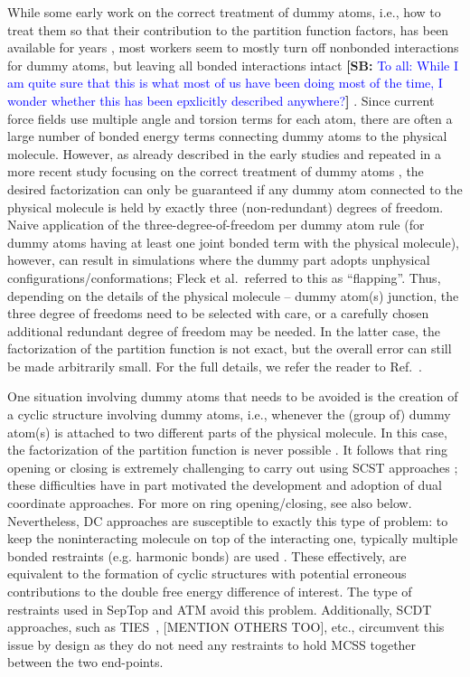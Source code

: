 \documentclass[9pt,bestpractices]{livecoms}
\newcommand{\sbnote}[1]{%
  {\bfseries{}[SB: }%
  {\textcolor{blue}{#1}}{\bfseries{}]}
}
\begin{document}
While some early work on the correct treatment of dummy atoms, i.e., how to treat them so that their contribution to the partition function factors, has been available for years \cite{Boresch_2002,Shobana_2000,Wang_2012}, most workers seem to mostly turn off nonbonded interactions for dummy atoms, but leaving all bonded interactions intact \sbnote{To all: While I am quite sure that this is what most of us have been doing most of the time, I wonder whether this has been epxlicitly described anywhere?}. Since current force fields use multiple angle and torsion terms for each atom, there are often a large number of bonded energy terms connecting dummy atoms to the physical molecule. However, as already described in the early studies and repeated in a more recent study focusing on the correct treatment of dummy atoms \cite{Fleck_2021}, the desired factorization can only be guaranteed if any dummy atom connected to the physical molecule is held by exactly three (non-redundant) degrees of freedom. Naive application of the three-degree-of-freedom per dummy atom rule (for dummy atoms having at least one joint bonded term with the physical molecule), however, can result in simulations where the dummy part adopts unphysical configurations/conformations; Fleck et al.\ referred to this as “flapping”. Thus, depending on the details of the physical molecule -- dummy atom(s) junction, the three degree of freedoms need to be selected with care, or a carefully chosen additional redundant degree of freedom may be needed. In the latter case, the factorization of the partition function is not exact, but the overall error can still be made arbitrarily small. For the full details, we refer the reader to Ref.~\cite{Fleck_2021}. 

One situation involving dummy atoms that needs to be avoided is the creation of a cyclic structure involving dummy atoms, i.e., whenever the (group of) dummy atom(s) is attached to two different parts of the physical molecule. In this case, the factorization of the partition function is never possible \cite{Shobana_2000}. It follows that ring opening or closing is extremely challenging to carry out using SCST approaches \cite{liu2015ring}; these difficulties have in part motivated the development and adoption of dual coordinate approaches. For more on ring opening/closing, see also below. Nevertheless, DC approaches are susceptible to exactly this type of problem: to keep the noninteracting molecule on top of the interacting one, typically multiple bonded restraints (e.g. harmonic bonds) are used \cite{Axelsen_1998,Ries_2022}. These effectively, are equivalent to the formation of cyclic structures with potential erroneous contributions to the double free energy difference of interest. The type of restraints used in SepTop \cite{rocklin2013separated,Baumann_2023} and ATM \cite{Azimi_2022} avoid this problem.
Additionally, SCDT approaches, such as TIES~\cite{bhati2017}, [MENTION OTHERS TOO], etc., circumvent this issue by design as they do not need any restraints to hold MCSS together between the two end-points.
\end{document}
